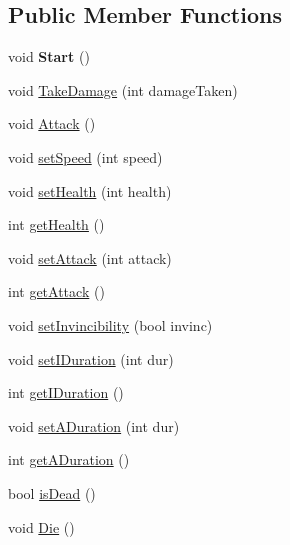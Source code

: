\subsection*{Public Member Functions}
\begin{DoxyCompactItemize}
\item 
\mbox{\label{class_i_player_a2053dee5dea8db35fe793024ea4d16a9}} 
void {\bfseries Start} ()
\item 
void \mbox{\hyperlink{class_i_player_a8a19883d426fa172adc043332426d7ec}{Take\+Damage}} (int damage\+Taken)
\item 
void \mbox{\hyperlink{class_i_player_a58a8e761b790450e9e190b3fdb5f2d29}{Attack}} ()
\item 
void \mbox{\hyperlink{class_i_player_a073e6b521b71c82a8e8d380ae991236f}{set\+Speed}} (int speed)
\item 
void \mbox{\hyperlink{class_i_player_a30143696c1b07bf382b8dac33cb7e6c1}{set\+Health}} (int health)
\item 
int \mbox{\hyperlink{class_i_player_a355f4da5d038c40df94194a2c545f526}{get\+Health}} ()
\item 
void \mbox{\hyperlink{class_i_player_ac5e448510f1d5c2b09ccd6e71aef57c8}{set\+Attack}} (int attack)
\item 
int \mbox{\hyperlink{class_i_player_aaf464871461953c9a35faac73a0d054f}{get\+Attack}} ()
\item 
void \mbox{\hyperlink{class_i_player_a2023f2ac17d8b79bb7f6d1830eca938f}{set\+Invincibility}} (bool invinc)
\item 
void \mbox{\hyperlink{class_i_player_a0a2ab5ba7ee4bfbba5e66f79315dd58c}{set\+I\+Duration}} (int dur)
\item 
int \mbox{\hyperlink{class_i_player_ad97d3469ea99b797926c1ec2c0b70c28}{get\+I\+Duration}} ()
\item 
void \mbox{\hyperlink{class_i_player_a3eaa74cff113c64a6cee96c9e0b3da5c}{set\+A\+Duration}} (int dur)
\item 
int \mbox{\hyperlink{class_i_player_a81cb512517a08129c77e730c114c5f98}{get\+A\+Duration}} ()
\item 
bool \mbox{\hyperlink{class_i_player_a4575d071d3465f3c0808232c222eb7cb}{is\+Dead}} ()
\item 
void \mbox{\hyperlink{class_i_player_a62499ee0288916e1220f64e18653c7b7}{Die}} ()
\end{DoxyCompactItemize}
